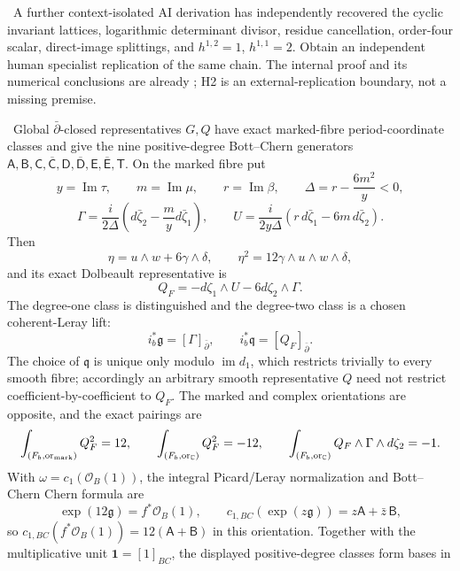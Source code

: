 \begin{auditrecord}
\Open\ A further context-isolated AI derivation has independently recovered
the cyclic invariant lattices, logarithmic determinant divisor, residue
cancellation, order-four scalar, direct-image splittings, and
$h^{1,2}=1$, $h^{1,1}=2$.  Obtain an independent human specialist
replication of the same chain.  The internal proof and its numerical
conclusions are already \Verified; H2 is an external-replication boundary,
not a missing premise.
\end{auditrecord}

\begin{auditrecord}
\Verified\ Global $\bar\partial$-closed representatives $G,Q$ have exact
marked-fibre period-coordinate classes and give the nine positive-degree
Bott--Chern generators
$\mathsf A,\mathsf B,\mathsf C,\overline{\mathsf C},
\mathsf D,\overline{\mathsf D},
 \mathsf E,\overline{\mathsf E},\mathsf T$.
On the marked fibre put
\[
 y=\operatorname{Im}\tau,\qquad m=\operatorname{Im}\mu,\qquad
 r=\operatorname{Im}\beta,\qquad
 \Delta=r-\frac{6m^2}{y}<0,
\]
\[
 \Gamma=\frac{i}{2\Delta}
 \left(d\bar\zeta_2-\frac{m}{y}d\bar\zeta_1\right),\qquad
 U=\frac{i}{2y\Delta}
 \left(r\,d\bar\zeta_1-6m\,d\bar\zeta_2\right).
\]
Then
\[
 \eta=u\wedge w+6\gamma\wedge\delta,
 \qquad \eta^2=12\gamma\wedge u\wedge w\wedge\delta,
\]
and its exact Dolbeault representative is
\[
 Q_F=-d\zeta_1\wedge U-6d\zeta_2\wedge\Gamma.
\]
The degree-one class is distinguished and the degree-two class is a chosen
coherent-Leray lift:
\[
 i_b^*\mathfrak g=[\Gamma]_{\bar\partial},\qquad
 i_b^*\mathfrak q=[Q_F]_{\bar\partial}.
\]
The choice of $\mathfrak q$ is unique only modulo
$\operatorname{im}d_1$, which restricts trivially to every smooth fibre;
accordingly an arbitrary smooth representative $Q$ need not restrict
coefficient-by-coefficient to $Q_F$.
The marked and complex orientations are opposite, and the exact pairings are
\[
 \int_{(F_b,\mathrm{or}_{\rm mark})}Q_F^2=12,
 \qquad
 \int_{(F_b,\mathrm{or}_{\mathbb C})}Q_F^2=-12,
 \qquad
 \int_{(F_b,\mathrm{or}_{\mathbb C})}
 Q_F\wedge\Gamma\wedge d\zeta_2=-1.
\]
With $\omega=c_1(\mathcal O_B(1))$, the integral Picard/Leray normalization
and Bott--Chern Chern formula are
\[
 \exp(12\mathfrak g)=f^*\mathcal O_B(1),\qquad
 c_{1,BC}(\exp(z\mathfrak g))=z\mathsf A+\bar z\,\mathsf B,
\]
so $c_{1,BC}(f^*\mathcal O_B(1))=12(\mathsf A+\mathsf B)$ in this
orientation.  Together with the multiplicative unit
$\mathbf1=[1]_{BC}$, the displayed positive-degree classes form bases in

\end{auditrecord}
